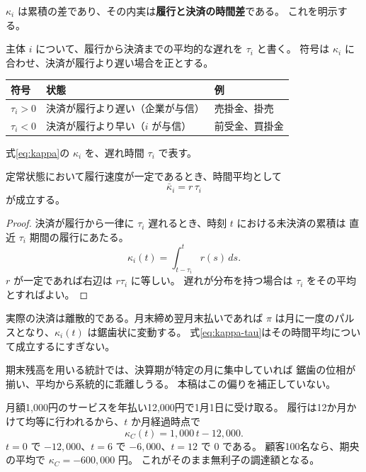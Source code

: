 $\kappa_i$ は累積の差であり、その内実は\textbf{履行と決済の時間差}である。
これを明示する。

\begin{definition}[決済の遅れ]
主体 $i$ について、履行から決済までの平均的な遅れを $\tau_i$ と書く。
符号は $\kappa_i$ に合わせ、決済が履行より遅い場合を正とする。
\begin{center}
\begin{tabularx}{\textwidth}{@{}lXl@{}}
\toprule
符号 & 状態 & 例 \\
\midrule
$\tau_i>0$ & 決済が履行より遅い（企業が与信） & 売掛金、掛売 \\
$\tau_i<0$ & 決済が履行より早い（$i$ が与信） & 前受金、買掛金 \\
\bottomrule
\end{tabularx}
\label{tab:tau-sign}
\end{center}
\end{definition}

式\eqref{eq:kappa}の $\kappa_i$ を、遅れ時間 $\tau_i$ で表す。

\begin{proposition}[信用ポジションの分解]
\label{prop:kappa-tau}
定常状態において履行速度が一定であるとき、時間平均として
\begin{equation}
\bar{\kappa}_i = r\,\tau_i
\label{eq:kappa-tau}
\end{equation}
が成立する。
\end{proposition}

\begin{proof}
決済が履行から一律に $\tau_i$ 遅れるとき、時刻 $t$ における未決済の累積は
直近 $\tau_i$ 期間の履行にあたる。
\[
\kappa_i(t) = \int_{t-\tau_i}^{t} r(s)\,ds .
\]
$r$ が一定であれば右辺は $r\tau_i$ に等しい。
遅れが分布を持つ場合は $\tau_i$ をその平均とすればよい。
\end{proof}

\begin{remark}[平均としてのみ成立する]
\label{rem:kappa-tau-average}
実際の決済は離散的である。月末締め翌月末払いであれば
$\pi$ は月に一度のパルスとなり、$\kappa_i(t)$ は鋸歯状に変動する。
式\eqref{eq:kappa-tau}はその時間平均について成立するにすぎない。

期末残高を用いる統計では、決算期が特定の月に集中していれば
鋸歯の位相が揃い、平均から系統的に乖離しうる。
本稿はこの偏りを補正していない。
\end{remark}

\begin{example}
月額1,000円のサービスを年払い12,000円で1月1日に受け取る。
履行は12か月かけて均等に行われるから、$t$ か月経過時点で
\[
\kappa_C(t) = 1{,}000\,t - 12{,}000 .
\]
$t=0$ で $-12{,}000$、$t=6$ で $-6{,}000$、$t=12$ で $0$ である。
顧客100名なら、期央の平均で $\kappa_C = -600{,}000$ 円。
これがそのまま無利子の調達額となる。
\end{example}

